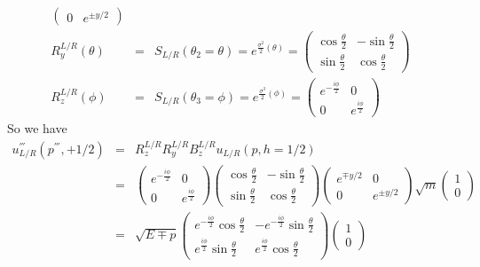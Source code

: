 \documentclass[11pt]{article}
\begin{document}
\begin{itemize}
\begin{eqnarray}
\begin{pmatrix}
            0 & e^{\pm y/2}
        \end{pmatrix} \\
        R_y^{L/R}(\theta)&=&S_{L/R}(\theta_2=\theta)=e^{\frac{\sigma^2}{2}(\theta)}=
        \begin{pmatrix}
            \cos \frac{\theta}{2} & -\sin \frac{\theta}{2} \\
            \sin \frac{\theta}{2} & \cos \frac{\theta}{2}
        \end{pmatrix}\\
        R_z^{L/R}(\phi)&=&S_{L/R}(\theta_3=\phi)=e^{\frac{\sigma^3}{2}(\phi)}=
        \begin{pmatrix}
            e^{-\frac{i\phi}{2}} & 0 \\
            0 & e^{\frac{i\phi}{2}}
        \end{pmatrix}
    \end{eqnarray}
   So we have
   \begin{eqnarray}
        u^{'''}_{L/R}(p^{'''},+1/2)&=&R_z^{L/R} R_y^{L/R} B_z^{L/R} u_{L/R}(p,h=1/2) \\
        &=&
        \begin{pmatrix}
            e^{-\frac{i\phi}{2}} & 0 \\
            0 & e^{\frac{i\phi}{2}}
        \end{pmatrix}
        \begin{pmatrix}
            \cos \frac{\theta}{2} & -\sin \frac{\theta}{2} \\
            \sin \frac{\theta}{2} & \cos \frac{\theta}{2}
        \end{pmatrix}
        \begin{pmatrix}
            e^{\mp y/2} & 0\\
            0 & e^{\pm y/2}
        \end{pmatrix}
        \sqrt{m}
        \begin{pmatrix}
            1 \\ 0
        \end{pmatrix}\\
        &=& \sqrt{E\mp p}
        \begin{pmatrix}
            e^{-\frac{i\phi}{2}} \cos \frac{\theta}{2}   &  - e^{-\frac{i\phi}{2}} \sin \frac{\theta}{2} \\
            e^{\frac{i\phi}{2}} \sin \frac{\theta}{2} & e^{\frac{i\phi}{2}} \cos \frac{\theta}{2}
        \end{pmatrix}
        \begin{pmatrix}
            1 \\ 0

\end{pmatrix}
\end{eqnarray}
\end{itemize}
\end{document}
